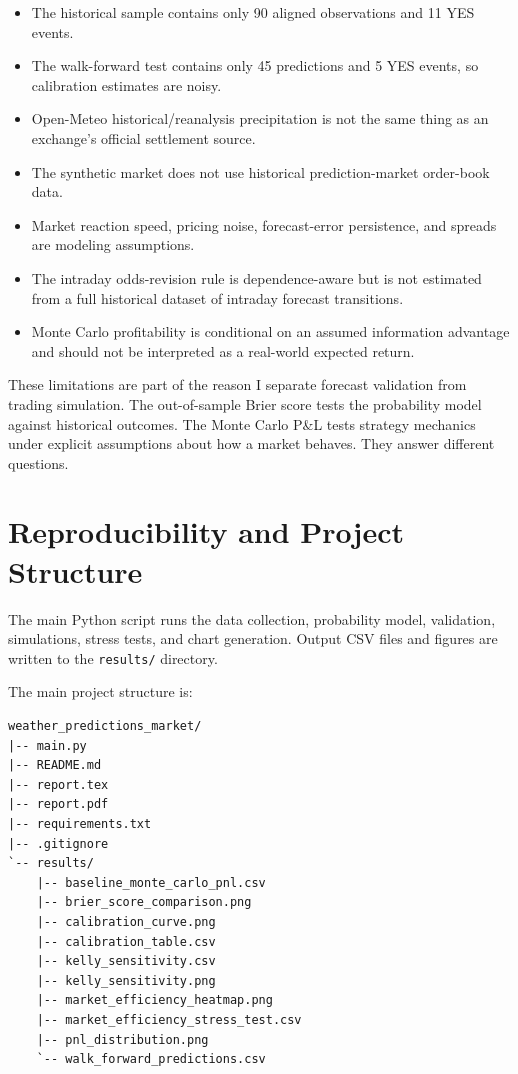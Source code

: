 \documentclass[11pt]{article}
\begin{document}
\begin{itemize}
    \item The historical sample contains only 90 aligned observations and 11 YES events.
    \item The walk-forward test contains only 45 predictions and 5 YES events, so calibration estimates are noisy.
    \item Open-Meteo historical/reanalysis precipitation is not the same thing as an exchange's official settlement source.
    \item The synthetic market does not use historical prediction-market order-book data.
    \item Market reaction speed, pricing noise, forecast-error persistence, and spreads are modeling assumptions.
    \item The intraday odds-revision rule is dependence-aware but is not estimated from a full historical dataset of intraday forecast transitions.
    \item Monte Carlo profitability is conditional on an assumed information advantage and should not be interpreted as a real-world expected return.
\end{itemize}

These limitations are part of the reason I separate forecast validation from trading simulation. The out-of-sample Brier score tests the probability model against historical outcomes. The Monte Carlo P\&L tests strategy mechanics under explicit assumptions about how a market behaves. They answer different questions.

\section{Reproducibility and Project Structure}

The main Python script runs the data collection, probability model, validation, simulations, stress tests, and chart generation. Output CSV files and figures are written to the \texttt{results/} directory.

The main project structure is:

\begin{verbatim}
weather_predictions_market/
|-- main.py
|-- README.md
|-- report.tex
|-- report.pdf
|-- requirements.txt
|-- .gitignore
`-- results/
    |-- baseline_monte_carlo_pnl.csv
    |-- brier_score_comparison.png
    |-- calibration_curve.png
    |-- calibration_table.csv
    |-- kelly_sensitivity.csv
    |-- kelly_sensitivity.png
    |-- market_efficiency_heatmap.png
    |-- market_efficiency_stress_test.csv
    |-- pnl_distribution.png
    `-- walk_forward_predictions.csv
\end{verbatim}
\end{document}
